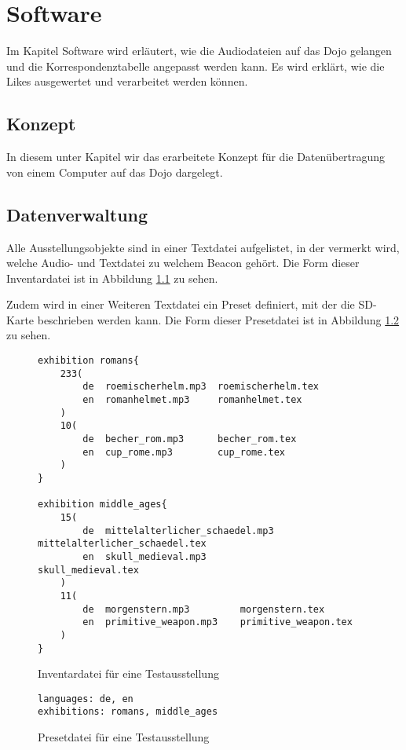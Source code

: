 \chapter{Software}
\label{Software}
\thispagestyle{fancy} 
Im Kapitel Software wird erläutert, wie die Audiodateien auf das Dojo gelangen und die Korrespondenztabelle angepasst werden kann. Es wird erklärt, wie die Likes ausgewertet und verarbeitet werden können.
\section{Konzept}
In diesem unter Kapitel wir das erarbeitete Konzept für die Datenübertragung von einem Computer auf das Dojo dargelegt.

\section{Datenverwaltung}
Alle Ausstellungsobjekte sind in einer Textdatei aufgelistet, in der vermerkt wird, welche Audio- und Textdatei zu welchem Beacon gehört.
Die Form dieser Inventardatei ist in Abbildung \ref{inventory_syntax} zu sehen.

Zudem wird in einer Weiteren Textdatei ein Preset definiert, mit der die SD-Karte beschrieben werden kann.
Die Form dieser Presetdatei ist in Abbildung \ref{preset_syntax} zu sehen.

\begin{figure}
	\begin{verbatim}
exhibition romans{
    233(
        de  roemischerhelm.mp3  roemischerhelm.tex
        en  romanhelmet.mp3     romanhelmet.tex
    )
    10(
        de  becher_rom.mp3      becher_rom.tex
        en  cup_rome.mp3        cup_rome.tex
    )
}

exhibition middle_ages{
    15(
        de  mittelalterlicher_schaedel.mp3  mittelalterlicher_schaedel.tex
        en  skull_medieval.mp3              skull_medieval.tex
    )
    11(
        de  morgenstern.mp3         morgenstern.tex
        en  primitive_weapon.mp3    primitive_weapon.tex
    )
}
	\end{verbatim}
	\caption{Inventardatei für eine Testausstellung}
	\label{inventory_syntax}
\end{figure}

\begin{figure}
	\begin{verbatim}
languages: de, en
exhibitions: romans, middle_ages
	\end{verbatim}
	\caption{Presetdatei für eine Testausstellung}
	\label{preset_syntax}
\end{figure}

